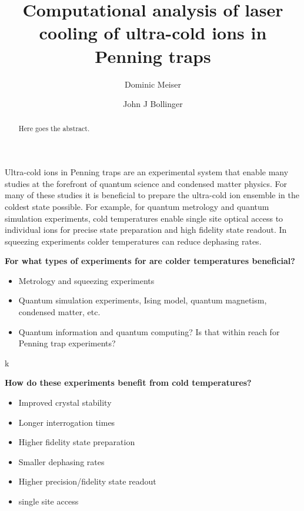 \documentclass[aps, pra, preprint]{revtex4-1}
\begin{document}
\title{Computational analysis of laser cooling of ultra-cold ions
  in Penning traps
}

\author{Dominic Meiser}
\author{John J Bollinger}

\begin{abstract}
  Here goes the abstract.
\end{abstract}

\maketitle


Ultra-cold ions in Penning traps are an experimental system that
enable many studies at the forefront of quantum science and
condensed matter physics. For many of these studies it is
beneficial to prepare the ultra-cold ion ensemble in the coldest
state possible. For example, for quantum
metrology and quantum simulation
experiments, cold temperatures enable single
site optical access to individual ions for precise state
preparation and high fidelity state readout. In squeezing
experiments colder temperatures can reduce dephasing rates.

{\bf For what types of experiments for are colder temperatures
beneficial?}
\begin{itemize}
\item Metrology and squeezing experiments
\item Quantum simulation experiments, Ising
  model\cite{Britton:EngineeredIsingModel}, quantum magnetism,
  condensed matter, etc.
\item Quantum information and quantum computing? Is that within
  reach for Penning trap experiments?
\end{itemize}k

{\bf How do these experiments benefit from cold temperatures?}
\begin{itemize}
\item Improved crystal stability
\item Longer interrogation times
\item Higher fidelity state preparation
\item Smaller dephasing rates
\item Higher precision/fidelity state readout
\item single site access
\end{itemize}
\end{document}
